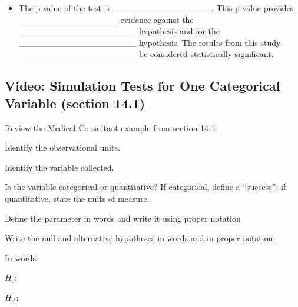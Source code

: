 \documentclass[
]{report}
\providecommand{\tightlist}{%
  \setlength{\itemsep}{0pt}\setlength{\parskip}{0pt}}
\newcommand{\rgi}{\hspace{24pt}}  %
\begin{document}

\begin{itemize}
\tightlist
\item
  The p-value of the test is \_\_\_\_\_\_\_\_\_\_\_\_\_\_\_\_. This p-value provides \_\_\_\_\_\_\_\_\_\_\_\_\_\_\_\_ evidence against the \_\_\_\_\_\_\_\_\_\_\_\_\_\_\_\_\_\_\_ hypothesis and for the \_\_\_\_\_\_\_\_\_\_\_\_\_\_\_\_\_\_\_ hypothesis. The results from this study \_\_\_\_\_\_\_\_\_\_\_\_\_\_\_\_\_\_\_ be considered statistically significant.
\end{itemize}

\vspace{0.1in}

\subsection*{Video: Simulation Tests for One Categorical Variable (section 14.1)}\label{video-simulation-tests-for-one-categorical-variable-section-14.1}

Review the Medical Consultant example from section 14.1.

Identify the observational units.

\vspace{0.3in}

Identify the variable collected.

\vspace{0.3in}

Is the variable categorical or quantitative? If categorical, define a ``success''; if quantitative, state the units of measure.

\vspace{0.3in}

Define the parameter in words and write it using proper notation

\vspace{0.5in}

\newpage

Write the null and alternative hypotheses in words and in proper notation:

\rgi In words:

\rgi \rgi \(H_0:\)

\vspace{0.45in}

\rgi \rgi \(H_A:\)

\vspace{0.45in}
\end{document}
